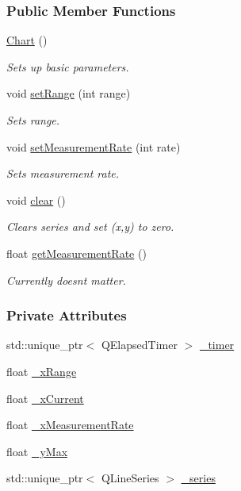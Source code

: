 \subsubsection*{Public Member Functions}
\begin{DoxyCompactItemize}
\item 
\hyperlink{classChart_a61896fddeb02818af2892cb6d9cdadb4}{Chart} ()
\begin{DoxyCompactList}\small\item\em Sets up basic parameters. \end{DoxyCompactList}\item 
void \hyperlink{classChart_a445baba8efcb1c0bea7f7f16e2d5b1e9}{set\+Range} (int range)
\begin{DoxyCompactList}\small\item\em Sets range. \end{DoxyCompactList}\item 
void \hyperlink{classChart_af996c93e298c33c8eeaead89d9933c15}{set\+Measurement\+Rate} (int rate)
\begin{DoxyCompactList}\small\item\em Sets measurement rate. \end{DoxyCompactList}\item 
void \hyperlink{classChart_a1bf5a87044118c780a83b1ff03428374}{clear} ()
\begin{DoxyCompactList}\small\item\em Clears series and set (x,y) to zero. \end{DoxyCompactList}\item 
float \hyperlink{classChart_a0636026f9baa6bbdc51a83fdad4db109}{get\+Measurement\+Rate} ()
\begin{DoxyCompactList}\small\item\em Currently doesn\textquotesingle{}t matter. \end{DoxyCompactList}\end{DoxyCompactItemize}
\subsubsection*{Private Attributes}
\begin{DoxyCompactItemize}
\item 
std\+::unique\+\_\+ptr$<$ Q\+Elapsed\+Timer $>$ \hyperlink{classChart_a586658c9f0ef3a3bd5d614a178436865}{\+\_\+timer}
\item 
float \hyperlink{classChart_a714191d2fc69d06d66872bba187d144b}{\+\_\+x\+Range}
\item 
float \hyperlink{classChart_a5434effc2361d5f6890982e83e8bc871}{\+\_\+x\+Current}
\item 
float \hyperlink{classChart_a7034a9d00d36ee96eb8af2d7c2af832d}{\+\_\+x\+Measurement\+Rate}
\item 
float \hyperlink{classChart_aeac5778c508d702f8deb07cbb7b2c867}{\+\_\+y\+Max}
\item 
std\+::unique\+\_\+ptr$<$ Q\+Line\+Series $>$ \hyperlink{classChart_a2b6b5680d382cb18164593293825fc08}{\+\_\+series}
\end{DoxyCompactItemize}


